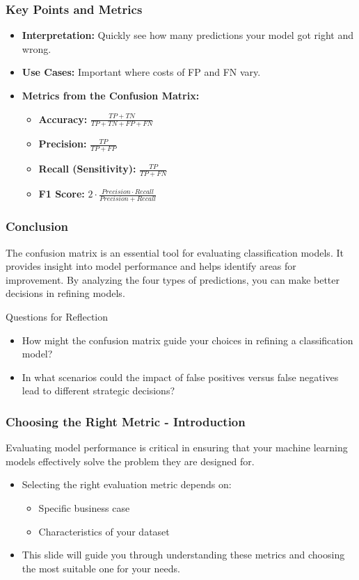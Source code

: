 \documentclass[aspectratio=169]{beamer}
\begin{document}
\begin{frame}[fragile]
    \frametitle{Key Points and Metrics}
    \begin{itemize}
        \item \textbf{Interpretation:} Quickly see how many predictions your model got right and wrong.
        \item \textbf{Use Cases:} Important where costs of FP and FN vary.
        \item \textbf{Metrics from the Confusion Matrix:}
        \begin{itemize}
            \item \textbf{Accuracy:} \(\frac{TP + TN}{TP + TN + FP + FN}\)
            \item \textbf{Precision:} \(\frac{TP}{TP + FP}\)
            \item \textbf{Recall (Sensitivity):} \(\frac{TP}{TP + FN}\)
            \item \textbf{F1 Score:} \(2 \cdot \frac{Precision \cdot Recall}{Precision + Recall}\)
        \end{itemize}
    \end{itemize}
\end{frame}

\begin{frame}[fragile]
    \frametitle{Conclusion}
    The confusion matrix is an essential tool for evaluating classification models. 
    It provides insight into model performance and helps identify areas for improvement. 
    By analyzing the four types of predictions, you can make better decisions in refining models.
    
    \begin{block}{Questions for Reflection}
        \begin{itemize}
            \item How might the confusion matrix guide your choices in refining a classification model?
            \item In what scenarios could the impact of false positives versus false negatives lead to different strategic decisions?
        \end{itemize}
    \end{block}
\end{frame}

\begin{frame}[fragile]
    \frametitle{Choosing the Right Metric - Introduction}
    Evaluating model performance is critical in ensuring that your machine learning models effectively solve the problem they are designed for. 
    \begin{itemize}
        \item Selecting the right evaluation metric depends on:
        \begin{itemize}
            \item Specific business case
            \item Characteristics of your dataset
        \end{itemize}
        \item This slide will guide you through understanding these metrics and choosing the most suitable one for your needs.
    \end{itemize}
\end{frame}
\end{document}
